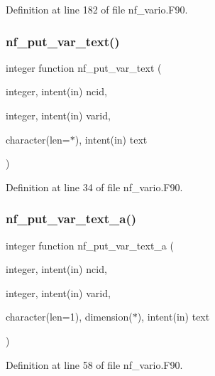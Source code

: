 Definition at line 182 of file nf\+\_\+vario.\+F90.

\mbox{\label{nf__vario_8F90_abd6a4aca3c29d6b23ca79993d33f2a90}} 
\subsubsection{\texorpdfstring{nf\+\_\+put\+\_\+var\+\_\+text()}{nf\_put\_var\_text()}}
{\footnotesize\ttfamily integer function nf\+\_\+put\+\_\+var\+\_\+text (\begin{DoxyParamCaption}\item[{integer, intent(in)}]{ncid,  }\item[{integer, intent(in)}]{varid,  }\item[{character(len=$\ast$), intent(in)}]{text }\end{DoxyParamCaption})}



Definition at line 34 of file nf\+\_\+vario.\+F90.

\mbox{\label{nf__vario_8F90_afe3929ce3dfe52d8cfdc862c8100c8f1}} 
\subsubsection{\texorpdfstring{nf\+\_\+put\+\_\+var\+\_\+text\+\_\+a()}{nf\_put\_var\_text\_a()}}
{\footnotesize\ttfamily integer function nf\+\_\+put\+\_\+var\+\_\+text\+\_\+a (\begin{DoxyParamCaption}\item[{integer, intent(in)}]{ncid,  }\item[{integer, intent(in)}]{varid,  }\item[{character(len=1), dimension($\ast$), intent(in)}]{text }\end{DoxyParamCaption})}



Definition at line 58 of file nf\+\_\+vario.\+F90.

